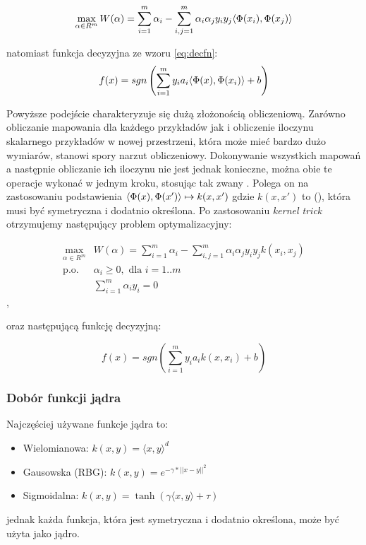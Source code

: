 \begin{equation}
\max\limits_{\alpha \in R^m}  W(\alpha) = \sum_{i=1}^{m} \alpha_i - \sum_{i,j=1}^{m} \alpha_i \alpha_j y_i y_j \langle \Phi(x_i), \Phi(x_j) \rangle
\label{eq:dual-k-target}
\end{equation}

natomiast funkcja decyzyjna ze wzoru \ref{eq:decfn}:
\begin{equation}
f(x) = sgn \left( \sum_{i=1}^{m} y_i a_i \langle \Phi(x), \Phi(x_i) \rangle + b \right)
\end{equation}

\FloatBarrier

Powyższe podejście charakteryzuje się dużą złożonością obliczeniową. Zarówno obliczanie mapowania dla każdego przykładów jak i obliczenie iloczynu skalarnego przykładów w nowej przestrzeni, która może mieć bardzo dużo wymiarów, stanowi spory narzut obliczeniowy. Dokonywanie wszystkich mapowań a następnie obliczanie ich iloczynu nie jest jednak konieczne, można obie te operacje wykonać w jednym kroku, stosując tak zwany  \cite{Boser:1992:TAO:130385.130401}. Polega on na zastosowaniu podstawienia $ \langle \Phi(x), \Phi(x') \rangle \mapsto k(x, x') $ gdzie $ k(x,x') $ to  (), która musi być symetryczna i dodatnio określona. Po zastosowaniu \emph{kernel trick} otrzymujemy następujący problem optymalizacyjny:

\begin{equation}
\begin{array}{ll}
\max\limits_{\alpha \in R^m} & W(\alpha) = \sum_{i=1}^{m} \alpha_i - \sum_{i,j=1}^{m} \alpha_i \alpha_j y_i y_j k(x_i, x_j) \\
\text{p.o.} &  \alpha_i \geq 0 , \text{ dla } i=1..m \\
& \sum_{i=1}^{m} \alpha_i y_i = 0
\end{array}
\label{eq:dual-k}
\end{equation},

oraz następującą funkcję decyzyjną: 

\begin{equation}
f(x) = sgn \left( \sum_{i=1}^{m} y_i a_i k(x, x_i) + b \right)
\label{eq:decfn-k}
\end{equation}

\subsubsection{Dobór funkcji jądra}

Najczęściej używane funkcje jądra to:	
\begin{itemize}
	\item Wielomianowa: $ k(x, y) = \langle x,y \rangle ^d $
	\item Gausowska (RBG): $k(x, y) =  e^{-\gamma*||x-y||^2} $	
	\item Sigmoidalna: $ k(x, y) = \tanh(\gamma \langle x,y \rangle + \tau) $
\end{itemize}
jednak każda funkcja, która jest symetryczna i dodatnio określona, może być użyta jako jądro.



